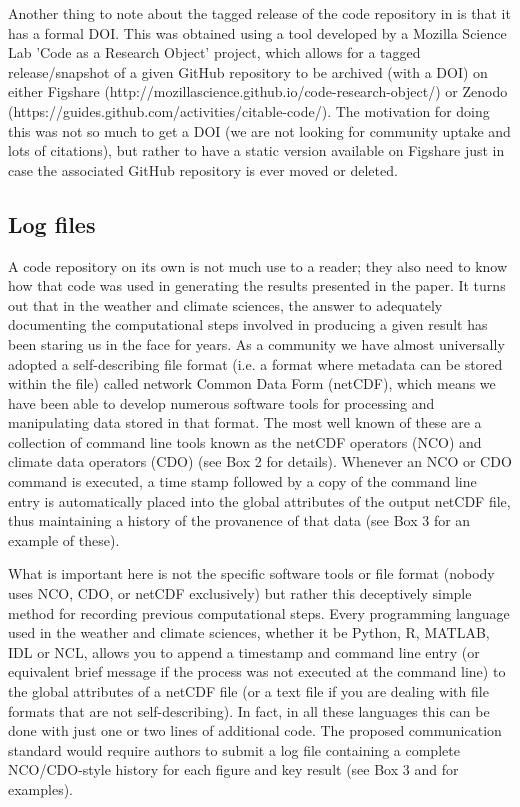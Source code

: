 Another thing to note about the tagged release of the code repository in \citet{Irving2015} is that it has a formal DOI. This was obtained using a tool developed by a Mozilla Science Lab 'Code as a Research Object' project, which allows for a tagged release/snapshot of a given GitHub repository to be archived (with a DOI) on either Figshare (http://mozillascience.github.io/code-research-object/) or Zenodo (https://guides.github.com/activities/citable-code/). The motivation for doing this was not so much to get a DOI (we are not looking for community uptake and lots of citations), but rather to have a static version available on Figshare just in case the associated GitHub repository is ever moved or deleted.  

\subsection{Log files}\label{s:log_files}

A code repository on its own is not much use to a reader; they also need to know how that code was used in generating the results presented in the paper. It turns out that in the weather and climate sciences, the answer to adequately documenting the computational steps involved in producing a given result has been staring us in the face for years. As a community we have almost universally adopted a self-describing file format (i.e. a format where metadata can be stored within the file) called network Common Data Form (netCDF), which means we have been able to develop numerous software tools for processing and manipulating data stored in that format. The most well known of these are a collection of command line tools known as the netCDF operators (NCO) and climate data operators (CDO) (see Box 2 for details). Whenever an NCO or CDO command is executed, a time stamp followed by a copy of the command line entry is automatically placed into the global attributes of the output netCDF file, thus maintaining a history of the provanence of that data (see Box 3 for an example of these).

What is important here is not the specific software tools or file format (nobody uses NCO, CDO, or netCDF exclusively) but rather this deceptively simple method for recording previous computational steps. Every programming language used in the weather and climate sciences, whether it be Python, R, MATLAB, IDL or NCL, allows you to append a timestamp and command line entry (or equivalent brief message if the process was not executed at the command line) to the global attributes of a netCDF file (or a text file if you are dealing with file formats that are not self-describing). In fact, in all these languages this can be done with just one or two lines of additional code. The proposed communication standard would require authors to submit a log file containing a complete NCO/CDO-style history for each figure and key result (see Box 3 and \citet{Irving2015} for examples).

